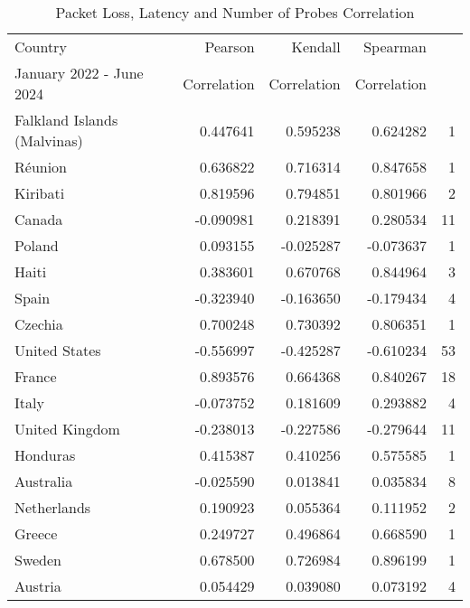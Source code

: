 \begin{table}[ht]
	\caption{Packet Loss, Latency and Number of Probes Correlation}
	\label{fig:packetloss-latency-number-probes-correlation}
	\begin{tabular}{lrrrr}
		\toprule
		Country                     & Pearson     & Kendall     & Spearman         \\
		January 2022 - June 2024    & Correlation & Correlation & Correlation      \\
		\midrule
		Falkland Islands (Malvinas) & 0.447641    & 0.595238    & 0.624282    & 1  \\
		Réunion                     & 0.636822    & 0.716314    & 0.847658    & 1  \\
		Kiribati                    & 0.819596    & 0.794851    & 0.801966    & 2  \\
		Canada                      & -0.090981   & 0.218391    & 0.280534    & 11 \\
		Poland                      & 0.093155    & -0.025287   & -0.073637   & 1  \\
		Haiti                       & 0.383601    & 0.670768    & 0.844964    & 3  \\
		Spain                       & -0.323940   & -0.163650   & -0.179434   & 4  \\
		Czechia                     & 0.700248    & 0.730392    & 0.806351    & 1  \\
		United States               & -0.556997   & -0.425287   & -0.610234   & 53 \\
		France                      & 0.893576    & 0.664368    & 0.840267    & 18 \\
		Italy                       & -0.073752   & 0.181609    & 0.293882    & 4  \\
		United Kingdom              & -0.238013   & -0.227586   & -0.279644   & 11 \\
		Honduras                    & 0.415387    & 0.410256    & 0.575585    & 1  \\
		Australia                   & -0.025590   & 0.013841    & 0.035834    & 8  \\
		Netherlands                 & 0.190923    & 0.055364    & 0.111952    & 2  \\
		Greece                      & 0.249727    & 0.496864    & 0.668590    & 1  \\
		Sweden                      & 0.678500    & 0.726984    & 0.896199    & 1  \\
		Austria                     & 0.054429    & 0.039080    & 0.073192    & 4  \\

\end{tabular}
\end{table}
